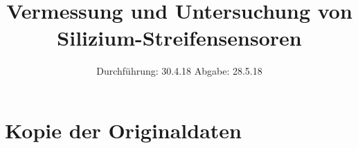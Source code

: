 

\subject{V 15}
\title{Vermessung und Untersuchung von Silizium-Streifensensoren}
\date{
  Durchführung: 30.4.18
  \hspace{3em}
  Abgabe: 28.5.18
}



\maketitle
\thispagestyle{empty}
\tableofcontents
\newpage






\printbibliography

\appendix
\section{Kopie der Originaldaten}


